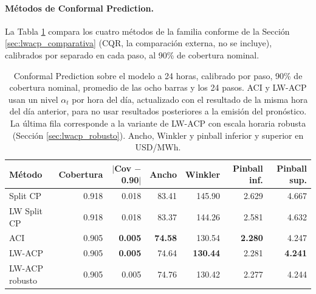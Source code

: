 \paragraph{Métodos de Conformal Prediction.} La Tabla \ref{tab:h24_cp_metodos} compara los cuatro métodos de la familia conforme de la Sección \ref{sec:lwacp_comparativa} (CQR, la comparación externa, no se incluye), calibrados por separado en cada paso, al 90\% de cobertura nominal.

\begin{table}[htbp]
    \centering
    \small
    \begin{tabular}{lrrrrrr}
        \toprule
        Método & Cobertura & $|$Cov $-$ 0.90$|$ & Ancho & Winkler & Pinball inf. & Pinball sup. \\
        \midrule
        Split CP    & 0.918 & 0.018 & 83.41 & 145.90 & 2.629 & 4.667 \\
        LW Split CP & 0.918 & 0.018 & 83.37 & 144.26 & 2.581 & 4.632 \\
        ACI         & 0.905 & \textbf{0.005} & \textbf{74.58} & 130.54 & \textbf{2.280} & 4.247 \\
        LW-ACP      & 0.905 & \textbf{0.005} & 74.64 & \textbf{130.44} & 2.281 & \textbf{4.241} \\
        \midrule
        LW-ACP robusto & 0.905 & 0.005 & 74.76 & 130.42 & 2.277 & 4.244 \\
        \bottomrule
    \end{tabular}
    \vspace{0.2cm}
    \caption{Conformal Prediction sobre el modelo a 24 horas, calibrado por paso, 90\% de cobertura nominal, promedio de las ocho barras y los 24 pasos. ACI y LW-ACP usan un nivel $\alpha_t$ por hora del día, actualizado con el resultado de la misma hora del día anterior, para no usar resultados posteriores a la emisión del pronóstico. La última fila corresponde a la variante de LW-ACP con escala horaria robusta (Sección \ref{sec:lwacp_robusto}). Ancho, Winkler y pinball inferior y superior en USD/MWh.}
    \label{tab:h24_cp_metodos}
\end{table}

